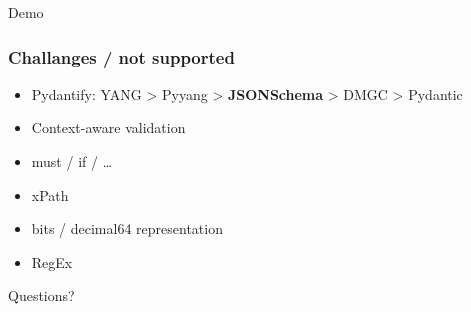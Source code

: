\documentclass[aspectratio=169]{beamer}
\begin{document}
{
\begin{frame}[plain,c]
  \begin{center}
    \Huge \color[rgb]{1,1,1}Demo
  \end{center}
\end{frame}
}

\begin{frame}
  \frametitle{Challanges / not supported}
  \begin{itemize}
    \setlength\itemsep{1em}
    \item Pydantify: YANG > Pyyang > \textbf{JSONSchema} > DMGC > Pydantic
    \item Context-aware validation
    \item must / if / \dots
    \item xPath
    \item bits / decimal64 representation
    \item RegEx
  \end{itemize}
\end{frame}

{
\begin{frame}[plain,c]
  \begin{center}
    \Huge \color[rgb]{1,1,1}Questions?
  \end{center}
\end{frame}
}
\end{document}
